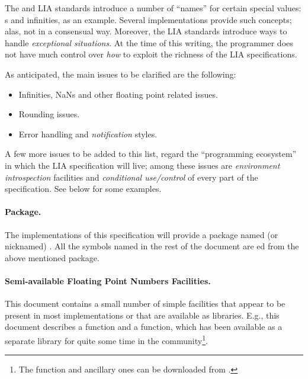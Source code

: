\documentclass[../../CDR-IEEE-754-support.tex]{subfiles}
\begin{document}
The \IEEEFPStd{} and LIA standards introduce a number of ``names'' for
certain special values: s and infinities, as an example.
Several \CL{} implementations provide such concepts; alas, not in a
consensual way.  Moreover, the LIA standards introduce ways to handle
\emph{exceptional situations}. At the time of this writing, the \CL{}
programmer does not have much control over \emph{how} to exploit the
richness of the LIA specifications.


\noindent
As anticipated, the main issues to be clarified are the following:
\begin{itemize}
\item Infinities, \textsf{NaN}s and other floating point related
  issues.
\item Rounding issues.
\item Error handling and \emph{notification} styles.
\end{itemize}
%
A few more issues to be added to this list, regard the ``programming
ecosystem'' in which the \CL{} LIA specification will live; among
these issues are \emph{environment introspection} facilities and
\emph{conditional use/control} of every part of the \CL{}
specification. See below for some examples.


\paragraph{\CLLIAPKG{} Package.}
\label{sect:package}
%
The implementations of this specification will provide a package named
(or nicknamed) \CLLIAPKG{}.  All the symbols named in the rest
of the document are ed from the above mentioned package.


\paragraph{Semi-available Floating Point Numbers Facilities.}
%
This document contains a small number of simple facilities that appear
to be present in most \CL{} implementations or that are available as
libraries.  E.g., this document describes a  function
and a  function, which has been available as a
separate library for quite some time in the community\footnote{The
   function and ancillary ones can be downloaded
  from \Quicklisp{} \cite{2008:Beane:Quicklisp}.}.
\end{document}
